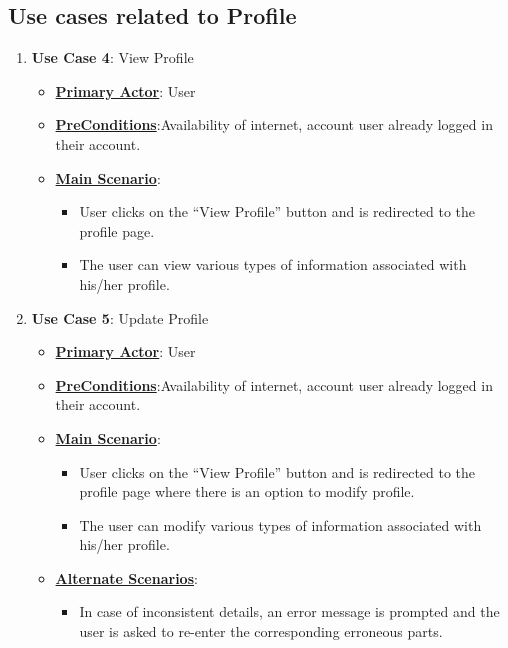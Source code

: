 \documentclass[english,a4paper,12pt]{report}
\begin{document}
\subsection{Use cases related to Profile}
\begin{enumerate}
    \item \textbf{Use Case 4}: View Profile
    \begin{itemize}
        \item \underline{\textbf{Primary Actor}}: User
        \item \underline{\textbf{PreConditions}}:Availability of internet, account user already logged in their account.
        \item \underline{\textbf{Main Scenario}}:
        \begin{itemize}
            \item User clicks on the “View Profile” button and is redirected to the profile page.
\item The user can view various types of information associated with his/her profile.
        \end{itemize}
    \end{itemize}
    
    \item \textbf{Use Case 5}: Update Profile
    \begin{itemize}
         \item \underline{\textbf{Primary Actor}}: User
        \item \underline{\textbf{PreConditions}}:Availability of internet, account user already logged in their account.
        \item \underline{\textbf{Main Scenario}}:
        \begin{itemize}
         \item User clicks on the “View Profile” button and is redirected to the profile page where there is an option to modify profile.
            \item The user can modify various types of information associated with his/her profile. 
        \end{itemize}
        \item \underline{\textbf{Alternate Scenarios}}:
        \begin{itemize}
            \item In case of inconsistent details, an error message is prompted and the user is asked to re-enter the corresponding erroneous parts.
        \end{itemize}
    \end{itemize}
    
  
\end{enumerate}
\end{document}
